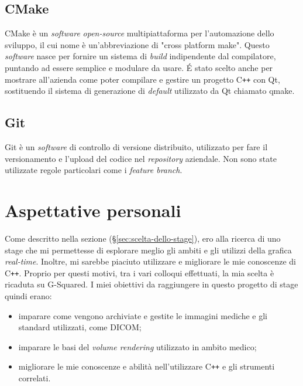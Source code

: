 \subsection{CMake}\label{sec:cmake}
CMake è un \emph{software} \emph{open-source} multipiattaforma per l'automazione dello sviluppo, il cui nome è un'abbreviazione di "cross platform make". Questo \emph{software} nasce per fornire un sistema di \emph{build} indipendente dal compilatore, puntando ad essere semplice e modulare da usare.
\'E stato scelto anche per mostrare all'azienda come poter compilare e gestire un progetto C\texttt{++} con Qt, sostituendo il sistema di generazione di \emph{default} utilizzato da Qt chiamato qmake.

\subsection{Git}
Git è un \emph{software} di controllo di versione distribuito, utilizzato per fare il versionamento e l'upload del codice nel \emph{repository} aziendale. Non sono state utilizzate regole particolari come i \emph{feature branch}. 



\section{Aspettative personali}
Come descritto nella sezione  (§\ref{sec:scelta-dello-stage}), ero alla ricerca di uno stage che mi permettesse di esplorare meglio gli ambiti e gli utilizzi della grafica \emph{real-time}. Inoltre, mi sarebbe piaciuto utilizzare e migliorare le mie conoscenze di C\texttt{++}. Proprio per questi motivi, tra i vari colloqui effettuati, la mia scelta è ricaduta su G-Squared. I miei obiettivi da raggiungere in questo progetto di stage quindi erano:
\begin{itemize}
\item imparare come vengono archiviate e gestite le immagini mediche e gli standard utilizzati, come DICOM;
\item imparare le basi del \emph{volume rendering} utilizzato in ambito medico;
\item migliorare le mie conoscenze e abilità nell'utilizzare C\texttt{++} e gli strumenti correlati.
\end{itemize}